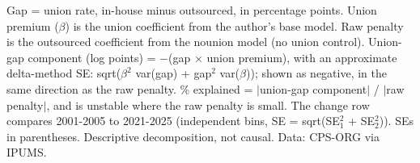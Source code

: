 \begin{table}[!t]
\begin{tabular}
\bottomrule
\end{tabular}
\begin{minipage}{\linewidth}\footnotesize
Gap = union rate, in-house minus outsourced, in percentage points. Union premium ($\beta$) is the union coefficient from the author's base model. Raw penalty is the outsourced coefficient from the nounion model (no union control). Union-gap component (log points) = $-$(gap $\times$ union premium), with an approximate delta-method SE: sqrt($\beta^2$ var(gap) + gap$^2$ var($\beta$)); shown as negative, in the same direction as the raw penalty. \% explained = $|$union-gap component$|$ / $|$raw penalty$|$, and is unstable where the raw penalty is small. The change row compares 2001-2005 to 2021-2025 (independent bins, SE = sqrt(SE$_1^2$ + SE$_2^2$)). SEs in parentheses. Descriptive decomposition, not causal. Data: CPS-ORG via IPUMS.
\end{minipage}
\end{table}
